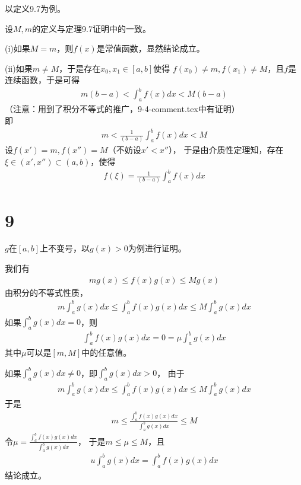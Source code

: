 \documentclass{article}
\begin{document}
以定义9.7为例。

设$M, m$的定义与定理9.7证明中的一致。

(i)如果$M = m$，则$f(x)$是常值函数，显然结论成立。

(ii)如果$m \neq M$，于是存在$x_0, x_1 \in [a, b]$使得
$f(x_0) \neq m, f(x_1) \neq M$，且$f$是连续函数，于是可得
\begin{align*}
  m(b - a) < \int_{a}^{b} f(x) dx < M(b - a)
\end{align*}
（注意：用到了积分不等式的推广，9-4-comment.tex中有证明）\\
即
\begin{align*}
  m < \frac{1}{(b - a)} \int_{a}^{b} f(x) dx < M
\end{align*}
设$f(x') = m, f(x'') = M$（不妨设$x' < x''$），
于是由介质性定理知，存在$\xi \in (x', x'') \subset (a, b)$，使得
\begin{align*}
  f(\xi) = \frac{1}{(b - a)} \int_{a}^{b} f(x) dx
\end{align*}

\section*{9}

$g$在$[a, b]$上不变号，以$g(x) > 0$为例进行证明。

我们有
\begin{align*}
  m g(x) \leq f(x) g(x) \leq M g(x)
\end{align*}
由积分的不等式性质，
\begin{align*}
  m \int_{a}^{b} g(x) dx \leq \int_{a}^{b} f(x) g(x) dx \leq M \int_{a}^{b} g(x) dx
\end{align*}
如果$\int_{a}^{b} g(x) dx = 0$，则
\begin{align*}
  \int_{a}^{b} f(x) g(x) dx = 0 = \mu \int_{a}^{b} g(x) dx
\end{align*}
其中$\mu$可以是$[m, M]$中的任意值。

如果$\int_{a}^{b} g(x) dx \neq 0$，即$\int_{a}^{b} g(x) dx > 0 $，
由于
\begin{align*}
  m \int_{a}^{b} g(x) dx \leq \int_{a}^{b} f(x) g(x) dx \leq M \int_{a}^{b} g(x) dx
\end{align*}
于是
\begin{align*}
  m \leq \frac{\int_{a}^{b} f(x) g(x) dx}{\int_{a}^{b} g(x) dx } \leq M
\end{align*}
令$\mu = \frac{\int_{a}^{b} f(x) g(x) dx}{\int_{a}^{b} g(x) dx }$，
于是$m \leq \mu \leq M$，且
\begin{align*}
  u \int_{a}^{b} g(x) dx = \int_{a}^{b} f(x) g(x) dx
\end{align*}
结论成立。
\end{document}
